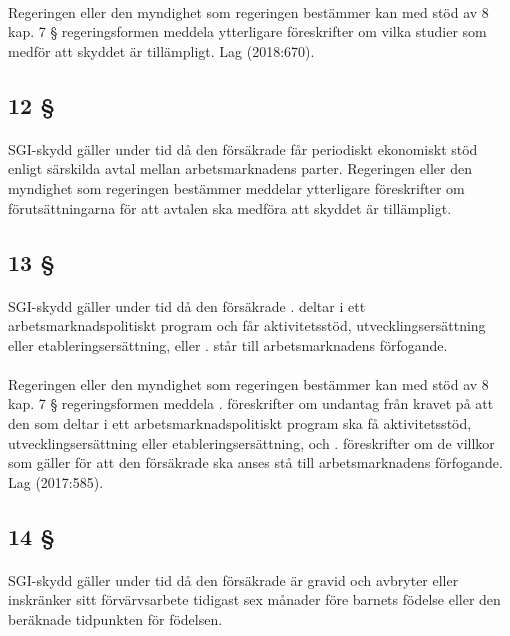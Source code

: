 \documentclass[a4paper,notitlepage,openany,10pt]{book}
\begin{document}
\paragraph*{}
Regeringen eller den myndighet som regeringen bestämmer kan med stöd av 8 kap. 7 § regeringsformen meddela ytterligare föreskrifter om vilka studier som medför att skyddet är tillämpligt.
Lag (2018:670).
\subsection*{12 §}
\paragraph*{}
SGI-skydd gäller under tid då den försäkrade får periodiskt ekonomiskt stöd enligt särskilda avtal mellan arbetsmarknadens parter. Regeringen eller den myndighet som regeringen bestämmer meddelar ytterligare föreskrifter om förutsättningarna för att avtalen ska medföra att skyddet är tillämpligt.
\subsection*{13 §}
\paragraph*{}
SGI-skydd gäller under tid då den försäkrade
. deltar i ett arbetsmarknadspolitiskt program och får aktivitetsstöd, utvecklingsersättning eller etableringsersättning, eller
. står till arbetsmarknadens förfogande.
\paragraph*{}
Regeringen eller den myndighet som regeringen bestämmer kan med stöd av 8 kap. 7 § regeringsformen meddela
. föreskrifter om undantag från kravet på att den som deltar i ett arbetsmarknadspolitiskt program ska få aktivitetsstöd, utvecklingsersättning eller etableringsersättning, och
. föreskrifter om de villkor som gäller för att den försäkrade ska anses stå till arbetsmarknadens förfogande.
Lag (2017:585).
\subsection*{14 §}
\paragraph*{}
SGI-skydd gäller under tid då den försäkrade är gravid och avbryter eller inskränker sitt förvärvsarbete tidigast sex månader före barnets födelse eller den beräknade tidpunkten för födelsen.
\end{document}
